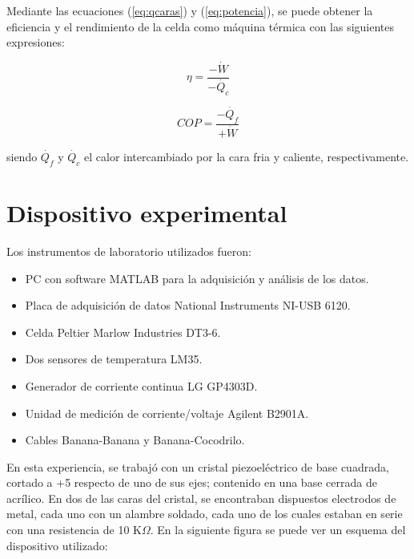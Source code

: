 \documentclass[twoside,twocolumn,a4paper]{article}
\begin{document}
Mediante las ecuaciones (\ref{eq:qcaras}) y (\ref{eq:potencia}), se puede obtener la eficiencia y el rendimiento de la celda como m\'aquina t\'ermica con las siguientes expresiones:


\begin{equation}
\label{eq:eficiencia}
\eta = \frac{-\dot{W}}{-\dot{Q_{c}}}
\end{equation}

\begin{equation}
\label{eq:rendimiento}
COP = \frac{-\dot{Q_{f}}}{+\dot{W}}
\end{equation}

siendo $\dot{Q_{f}}$ y $\dot{Q_{c}}$ el calor intercambiado por la cara fria y caliente, respectivamente.




\section{Dispositivo experimental}

Los instrumentos de laboratorio utilizados fueron:
\begin{itemize}
\item PC con software MATLAB para la adquisici\'on y an\'alisis de los datos.
\item Placa de adquisici\'on de datos National Instruments NI-USB 6120.
\item Celda Peltier Marlow Industries DT3-6.
\item Dos sensores de temperatura LM35.
\item Generador de corriente continua LG GP4303D.
\item Unidad de medici\'on de corriente/voltaje Agilent B2901A.
\item Cables Banana-Banana y Banana-Cocodrilo.
\end{itemize}





En esta experiencia, se trabaj\'o con un cristal piezoel\'ectrico de base cuadrada, cortado a +5 \degree respecto de uno de sus ejes; contenido en una base cerrada de acr\'ilico. En dos de las caras del cristal, se encontraban dispuestos electrodos de metal, cada uno con un alambre soldado, cada uno de los cuales estaban en serie con una resistencia de 10 K$\Omega$. En la siguiente figura se puede ver un esquema del dispositivo utilizado:
\end{document}
